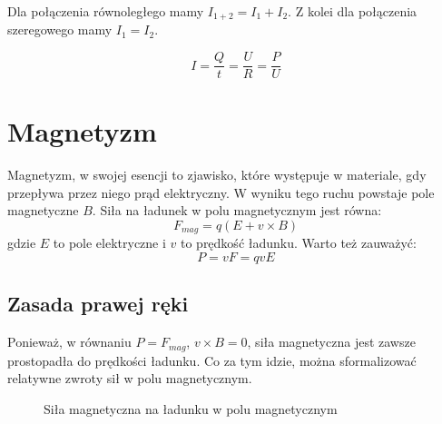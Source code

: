 \documentclass{../notatki}
\begin{document}
\begin{figure*}[h]
  \centering
\end{figure*}
Dla połączenia równoległego mamy $I_{1+2} = I_1 + I_2$. Z kolei dla
połączenia szeregowego mamy $I_1 = I_2$.

$$
I = \frac{Q}{t} = \frac{U}{R} = \frac{P}{U}
$$

\section{Magnetyzm}

Magnetyzm, w swojej esencji to zjawisko, które występuje w materiale, gdy
przepływa przez niego prąd elektryczny. W wyniku tego ruchu powstaje pole
magnetyczne $B$. Siła na ładunek w polu magnetycznym jest równa:
$$
F_{mag} =q(E + v \times B)
$$
gdzie $E$ to pole elektryczne i $v$ to prędkość ładunku.
Warto też zauważyć:
$$
P = vF = qvE
$$

\subsection{Zasada prawej ręki}

Ponieważ, w równaniu $P = F_{mag}$, $v \times B = 0$, siła
magnetyczna jest zawsze prostopadła do prędkości ładunku.
Co za tym idzie, można sformalizować relatywne zwroty sił w polu magnetycznym.
\begin{figure}[h]
  \centering
  \caption{Siła magnetyczna na ładunku w polu magnetycznym}
\end{figure}
\end{document}
